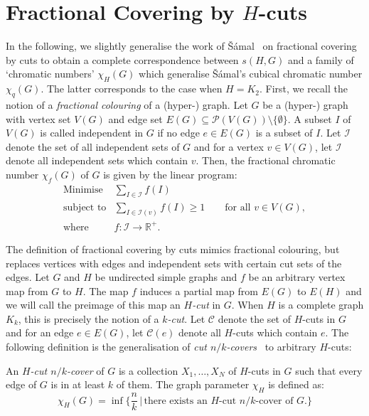 \documentclass[11pt,a4paper]{article}
\begin{document}
\section{Fractional Covering by $H$-cuts} \label{sec:cut}

In the following, we slightly generalise the work of 
\v{S}\'{a}mal~\cite{samal:05,samal:06} on fractional
covering by cuts to obtain a complete correspondence between $s(H,G)$ 
and a family of `chromatic numbers' $\chi_H(G)$ which generalise 
\v{S}\'{a}mal's cubical chromatic number $\chi_q(G)$. 
The latter corresponds to the case when $H = K_2$.
First, we recall the notion of a {\em fractional colouring} of a
(hyper-) graph.
Let $G$ be a (hyper-) graph with vertex set $V(G)$ and edge set 
$E(G) \subseteq \mathcal{P}(V(G)) \setminus \{ \emptyset \}$.
A subset $I$ of $V(G)$ is called independent in $G$ if no edge 
$e \in E(G)$ is a subset of $I$.
Let $\mathcal{I}$ denote the set of all independent sets of $G$
and for a vertex $v \in V(G)$, let $\mathcal{I}$ 
denote all independent sets which contain $v$.
Then, the fractional chromatic number $\chi_f(G)$ of $G$ is given by the
linear program:
\begin{equation}
\begin{array}{ll}
            \text{Minimise}   & \sum_{I \in \mathcal{I}} f(I) \\
            \text{subject to} & \sum_{I \in \mathcal{I}(v)} f(I) \geq 1 \qquad \text{for all $v \in V(G)$}, \\ \text{where}      & f : {\mathcal I} \rightarrow \mathbb{R}^+.
\end{array}
\end{equation}


The definition of fractional covering by cuts mimics fractional colouring,
but replaces vertices with edges and independent sets with certain cut
sets of the edges.
Let $G$ and $H$ be undirected simple graphs and $f$ be an arbitrary
vertex map from $G$ to $H$.
The map $f$ induces a partial map 
from $E(G)$ to $E(H)$ and we will call the preimage of this map an {\em $H$-cut} in $G$.
When $H$ is a complete graph $K_k$, this is precisely the notion of a
{\em $k$-cut}.
Let $\mathcal{C}$ denote the set of $H$-cuts in $G$ and for an edge 
$e \in E(G)$, let $\mathcal{C}(e)$ denote all $H$-cuts which
contain $e$.
The following definition is the generalisation of
{\em cut $n/k$-covers}~\cite{samal:06} to arbitrary $H$-cuts:
\begin{definition}
  An {\em $H$-cut $n/k$-cover} of $G$ is a collection $X_1, \ldots, X_N$ of 
  $H$-cuts in $G$ such that every edge of $G$ is in at least $k$ of them.
  The graph parameter $\chi_H$ is defined as:
  \begin{equation}
  \chi_H(G) = \inf 
  \{ \frac{n}{k} \,|\, \text{there exists an $H$-cut $n/k$-cover of $G$.} \}
  \end{equation}
\end{definition}
\end{document}
